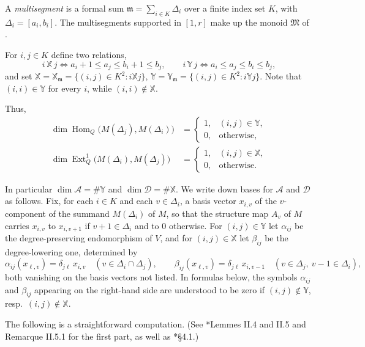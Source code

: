 \documentclass[12pt]{article}
\theoremstyle{definition}
\newcommand{\Ext}{\operatorname{Ext}}
\newcommand{\Hom}{\operatorname{Hom}}
\newcommand{\Mfr}{\mathfrak{M}}
\newcommand{\mm}{\mathfrak{m}}
\newcommand{\alg}{\mathcal{A}}   %
\newcommand{\bmdl}{\mathcal{D}}   %
\newcommand{\XX}{\mathbb{X}}  %
\newcommand{\YY}{\mathbb{Y}}  %
\newcommand{\Kk}{K}         %
\newcommand{\algbss}{\alpha}     %
\newcommand{\bmdlbss}{\beta}    %
\begin{document}
A \emph{multisegment} is a formal sum $\mm = \sum_{i \in \Kk}\Delta_i$ over a finite index set $\Kk$, with $\Delta_i = [a_i,b_i]$.
The multisegments supported in $[1,r]$ make up the monoid $\Mfr$ of .


For $i,j \in \Kk$ define two relations,
\[
   i\,\XX\,j \iff a_i + 1 \le a_j \le b_i + 1 \le b_j ,
   \qquad
   i\,\YY\,j \iff a_i \le a_j \le b_i \le b_j ,
\]
and set $\XX = \XX_\mm = \{(i,j) \in \Kk^2 : i \XX j\}$, $\YY = \YY_\mm =
\{(i,j) \in \Kk^2 : i \YY j\}$. Note that $(i,i) \in \YY$ for every $i$,
while $(i,i) \notin \XX$.

Thus,
\begin{align*}
   \dim\Hom_Q\bigl(M(\Delta_j),M(\Delta_i)\bigr) &=
   \begin{cases} 1, & (i,j) \in \YY,\\ 0, & \text{otherwise,}\end{cases}\\
   \dim\Ext^1_Q\bigl(M(\Delta_i),M(\Delta_j)\bigr) &=
   \begin{cases} 1, & (i,j) \in \XX,\\ 0, & \text{otherwise.}\end{cases}
\end{align*}


In particular $\dim\alg = \#\YY$ and $\dim\bmdl = \#\XX$. We write down
bases for $\alg$ and $\bmdl$ as follows. Fix, for each $i \in \Kk$ and each $v \in
\Delta_i$, a basis vector $x_{i,v}$ of the $v$-component of the summand
$M(\Delta_i)$ of $M$, so that the structure map $A_v$ of $M$ carries
$x_{i,v}$ to $x_{i,v+1}$ if $v+1\in\Delta_i$ and to $0$ otherwise. For $(i,j)
\in \YY$ let $\algbss_{ij}$ be the degree-preserving endomorphism of $V$, and for
$(i,j) \in \XX$ let $\bmdlbss_{ij}$ be the degree-lowering one, determined by
\begin{equation}\label{eq:explicitbasis}
   \algbss_{ij}(x_{\ell,v}) = \delta_{j\ell}\,x_{i,v}
   \quad (v \in \Delta_i\cap\Delta_j),
   \qquad
   \bmdlbss_{ij}(x_{\ell,v}) = \delta_{j\ell}\,x_{i,v-1}
   \quad (v \in \Delta_j,\ v-1\in\Delta_i),
\end{equation}
both vanishing on the basis vectors not listed. In formulas below, the symbols
$\algbss_{ij}$ and $\bmdlbss_{ij}$ appearing on the right-hand side are understood to be zero if
$(i,j)\notin\YY$, resp.\ $(i,j)\notin\XX$.

The following is a straightforward computation.
(See \cite{MR863522}*{Lemmes II.4 and II.5 and Remarque II.5.1} for the first part,
as well as \cite{MR3866895}*{\S4.1}.)
\end{document}
